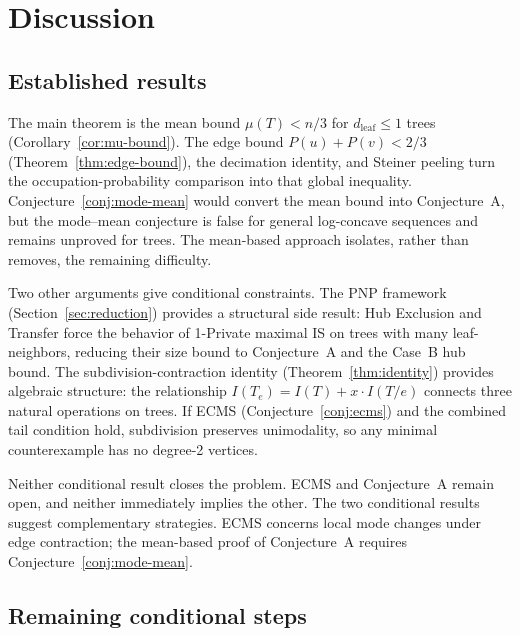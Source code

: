 \documentclass[12pt,oneside]{article}
\theoremstyle{remark}
\newcommand{\dleaf}{d_{\mathrm{leaf}}}    %
\begin{document}
\section{Discussion}\label{sec:discussion}

\subsection{Established results}

The main theorem is the mean bound $\mu(T)<n/3$ for $\dleaf\le1$ trees (Corollary~\ref{cor:mu-bound}).
The edge bound $P(u)+P(v)<2/3$ (Theorem~\ref{thm:edge-bound}), the decimation identity, and Steiner peeling turn the occupation-probability comparison into that global inequality.
Conjecture~\ref{conj:mode-mean} would convert the mean bound into Conjecture~A, but the mode--mean conjecture is false for general log-concave sequences and remains unproved for trees.
The mean-based approach isolates, rather than removes, the remaining difficulty.

Two other arguments give conditional constraints.
The PNP framework (Section~\ref{sec:reduction}) provides a structural side result: Hub Exclusion and Transfer force the behavior of 1-Private maximal IS on trees with many leaf-neighbors, reducing their size bound to Conjecture~A and the Case~B hub bound.
The subdivision-contraction identity (Theorem~\ref{thm:identity}) provides algebraic structure: the relationship $I(T_e) = I(T) + x \cdot I(T/e)$ connects three natural operations on trees.
If ECMS (Conjecture~\ref{conj:ecms}) and the combined tail condition hold, subdivision preserves unimodality, so any minimal counterexample has no degree-2 vertices.

Neither conditional result closes the problem.
ECMS and Conjecture~A remain open, and neither immediately implies the other.
The two conditional results suggest complementary strategies.
ECMS concerns local mode changes under edge contraction; the mean-based proof of Conjecture~A requires Conjecture~\ref{conj:mode-mean}.

\subsection{Remaining conditional steps}
\end{document}
